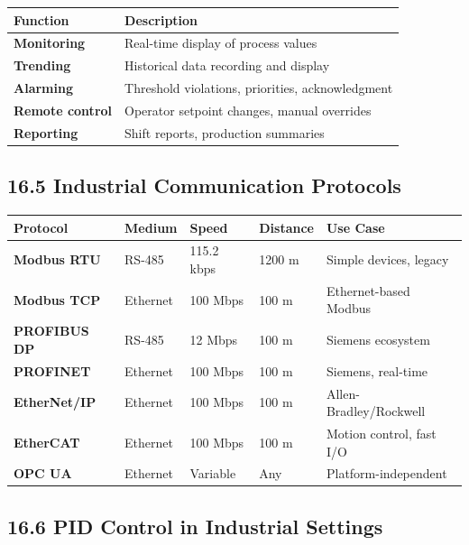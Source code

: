 \documentclass[11pt,a4paper]{book}
\begin{document}
\begin{itemize}
\begin{center}
\begin{tabular}{|l|l|}
\hline
Function & Description \\
\hline
\textbf{Monitoring} & Real-time display of process values \\
\textbf{Trending} & Historical data recording and display \\
\textbf{Alarming} & Threshold violations, priorities, acknowledgment \\
\textbf{Remote control} & Operator setpoint changes, manual overrides \\
\textbf{Reporting} & Shift reports, production summaries \\
\hline
\end{tabular}
\end{center}

\medskip\noindent\hrulefill\medskip

\subsection{16.5 Industrial Communication Protocols}

\begin{center}
\begin{tabular}{|l|l|l|l|l|}
\hline
Protocol & Medium & Speed & Distance & Use Case \\
\hline
\textbf{Modbus RTU} & RS-485 & 115.2 kbps & 1200 m & Simple devices, legacy \\
\textbf{Modbus TCP} & Ethernet & 100 Mbps & 100 m & Ethernet-based Modbus \\
\textbf{PROFIBUS DP} & RS-485 & 12 Mbps & 100 m & Siemens ecosystem \\
\textbf{PROFINET} & Ethernet & 100 Mbps & 100 m & Siemens, real-time \\
\textbf{EtherNet/IP} & Ethernet & 100 Mbps & 100 m & Allen-Bradley/Rockwell \\
\textbf{EtherCAT} & Ethernet & 100 Mbps & 100 m & Motion control, fast I/O \\
\textbf{OPC UA} & Ethernet & Variable & Any & Platform-independent \\
\hline
\end{tabular}
\end{center}

\medskip\noindent\hrulefill\medskip

\subsection{16.6 PID Control in Industrial Settings}


\end{itemize}
\end{document}

